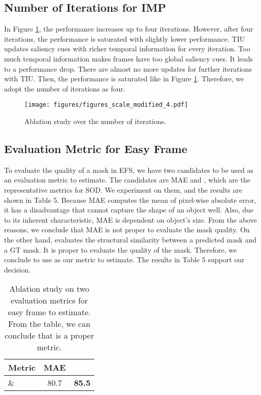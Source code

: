 \documentclass[letterpaper]{article} \usepackage{aaai22}  \usepackage{times}  \usepackage{helvet}  \usepackage{courier}  \usepackage[hyphens]{url}  \usepackage{graphicx} \urlstyle{rm} \def\UrlFont{\rm}  \usepackage{natbib}  \usepackage{caption} \DeclareCaptionStyle{ruled}{labelfont=normalfont,labelsep=colon,strut=off} \frenchspacing  \setlength{\pdfpagewidth}{8.5in}  \setlength{\pdfpageheight}{11in}  \usepackage{algorithm}
\begin{document}
\subsection{Number of Iterations for IMP}

In Figure \ref{figure4}, the performance increases up to four iterations. However, after four iterations, the performance is saturated with slightly lower performance. TIU updates saliency cues with richer temporal information for every iteration. Too much temporal information makes frames have too global saliency cues. It leads to a performance drop. There are almost no more updates for further iterations with TIU. Then, the performance is saturated like in Figure \ref{figure4}. Therefore, we adopt the number of iterations as four.

\begin{figure}[h]
\centering
\texttt{[image: figures/figures\_scale\_modified\_4.pdf]}
\caption{Ablation study over the number of iterations.}
\label{figure4}
\end{figure}

\subsection{Evaluation Metric for Easy Frame}

To evaluate the quality of a mask in EFS, we have two candidates to be used as an evaluation metric to estimate. The candidates are MAE and , which are the representative metrics for SOD. We experiment on them, and the results are shown in Table 5. Because MAE computes the mean of pixel-wise absolute error, it has a disadvantage that cannot capture the shape of an object well. Also, due to its inherent characteristic, MAE is dependent on object’s size. From the above reasons, we conclude that MAE is not proper to evaluate the mask quality. On the other hand,  evaluates the structural similarity between a predicted mask and a GT mask. It is proper to evaluate the quality of the mask. Therefore, we conclude to use  as our metric to estimate. The results in Table 5 support our decision. 

\begin{table}[h]
\centering
\caption{Ablation study on two evaluation metrics for easy frame to estimate. From the table, we can conclude that  is a proper metric.
}\begin{tabular}{l|cc}
\toprule
Metric & MAE    & \\ \midrule
\&     & 80.7 & \textbf{85.5}\\ \bottomrule
\end{tabular}
\label{table5}
\end{table}
\end{document}
